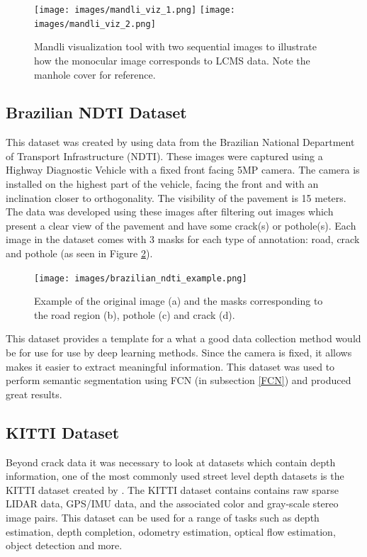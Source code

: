 \documentclass{article}
\begin{document}
\begin{figure}[ht]
\begin{center}
\texttt{[image: images/mandli\_viz\_1.png]}
\texttt{[image: images/mandli\_viz\_2.png]}
\end{center}
\caption{Mandli visualization tool with two sequential images to illustrate how the monocular image corresponds to LCMS data. Note the manhole cover for reference.}
\label{fig:mandli_viz_tool}
\end{figure}

\subsection{Brazilian NDTI Dataset}
This dataset was created by \cite{Passos2020CracksAP} using data from the
Brazilian National Department of Transport Infrastructure (NDTI). These images were captured using a Highway Diagnostic Vehicle with a fixed front facing 5MP camera. The camera is installed on the highest part of the vehicle, facing the front and with an inclination closer to orthogonality. The visibility of the pavement is 15 meters. The data was developed using these images after filtering out images which present a clear view of the pavement and have some crack(s) or pothole(s). Each image in the dataset comes with 3 masks for each type of annotation: road, crack and pothole (as seen in Figure \ref{fig:brazilian_example}).


\begin{figure}[ht]
\begin{center}
\texttt{[image: images/brazilian\_ndti\_example.png]}
\end{center}
\caption{Example of the original image (a) and the masks corresponding to the road region (b), pothole (c) and crack (d).}
\label{fig:brazilian_example}
\end{figure}

This dataset provides a template for a what a good data collection method would be for use for use by deep learning methods. Since the camera is fixed, it allows makes it easier to extract meaningful information. This dataset was used to perform semantic segmentation using FCN (in subsection \ref{FCN}) and produced great results.

\subsection{KITTI Dataset}
Beyond crack data it was necessary to look at datasets which contain depth information, one of the most commonly used street level depth datasets is the KITTI dataset created by \cite{KITTI_raw_dataset}.
The KITTI dataset contains contains raw sparse LIDAR data, GPS/IMU data, and the associated color and gray-scale stereo image pairs.
This dataset can be used for a range of tasks such as depth estimation, depth completion, odometry estimation, optical flow estimation, object detection and more.
\end{document}
